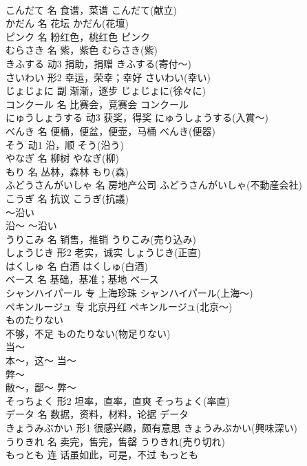 \documentclass[8pt]{extreport}
\begin{document}
\begin{CJK}{UTF8}{min}
\\	こんだて	名	食谱，菜谱	こんだて(献立)	
\\	かだん	名	花坛	かだん(花壇)	
\\	ピンク	名	粉红色，桃红色	ピンク	
\\	むらさき	名	紫，紫色	むらさき(紫)	
\\	きふする	动3	捐助，捐赠	きふする(寄付～)	
\\	さいわい	形2	幸运，荣幸；幸好	さいわい(幸い)	
\\	じょじょに	副	渐渐，逐步	じょじょに(徐々に)	
\\	コンクール	名	比赛会，竞赛会	コンクール	
\\	にゅうしょうする	动3	获奖，得奖	にゅうしょうする(入賞～)	
\\	べんき	名	便桶，便盆，便壶，马桶	べんき(便器)	
\\	そう	动1	沿，顺	そう(沿う)	
\\	やなぎ	名	柳树	やなぎ(柳)	
\\	もり	名	丛林，森林	もり(森)	
\\	ふどうさんがいしゃ	名	房地产公司	ふどうさんがいしゃ(不動産会社)	
\\	こうぎ	名	抗议	こうぎ(抗議)	
\\	～沿い	
\\	沿～	～沿い	
\\	うりこみ	名	销售，推销	うりこみ(売り込み)	
\\	しょうじき	形2	老实，诚实	しょうじき(正直)	
\\	はくしゅ	名	白酒	はくしゅ(白酒)	
\\	ベース	名	基础，基准；基地	ベース	
\\	シャンハイパール	专	上海珍珠	シャンハイパール(上海～)	
\\	ペキンルージュ	专	北京丹红	ペキンルージュ(北京～)	
\\	ものたりない	
\\	不够，不足	ものたりない(物足りない)	
\\	当～	
\\	本～，这～	当～	
\\	弊～	
\\	敝～，鄙～	弊～	
\\	そっちょく	形2	坦率，直率，直爽	そっちょく(率直)	
\\	データ	名	数据，资料，材料，论据	データ	
\\	きょうみぶかい	形1	很感兴趣，颇有意思	きょうみぶかい(興味深い)	
\\	うりきれ	名	卖完，售完，售罄	うりきれ(売り切れ)	
\\	もっとも	连	话虽如此，可是，不过	もっとも	

\end{CJK}
\end{document}
